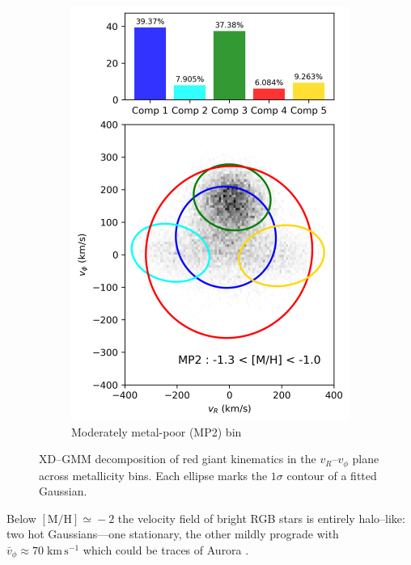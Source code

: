 \documentclass[a4paper,10pt]{article}
\begin{document}
\begin{multicols}{2}
\begin{figure}[H]
\begin{subfigure}[t]{0.48\linewidth}
    \includegraphics[width=\linewidth]{../figures/gmm_MP2.png}
    \caption{Moderately metal-poor (MP2) bin}
    \label{fig:gmm_mp2}
  \end{subfigure}

  \caption{XD–GMM decomposition of red giant kinematics in the $v_R$–$v_\phi$ plane across metallicity bins. Each ellipse marks the $1\sigma$ contour of a fitted Gaussian.}
  \label{fig:gmm_2x2}
\end{figure}



Below $\mathrm{[M/H]}\!\simeq\!-2$ the velocity field of bright RGB stars is entirely halo–like: 
two hot Gaussians—one stationary, the other mildly prograde with 
$\bar{v}_{\phi}\!\approx\!70\;\mathrm{km\,s^{-1}}$ which could be traces of Aurora \cite{Belokurov2022}.


\end{multicols}
\end{document}
